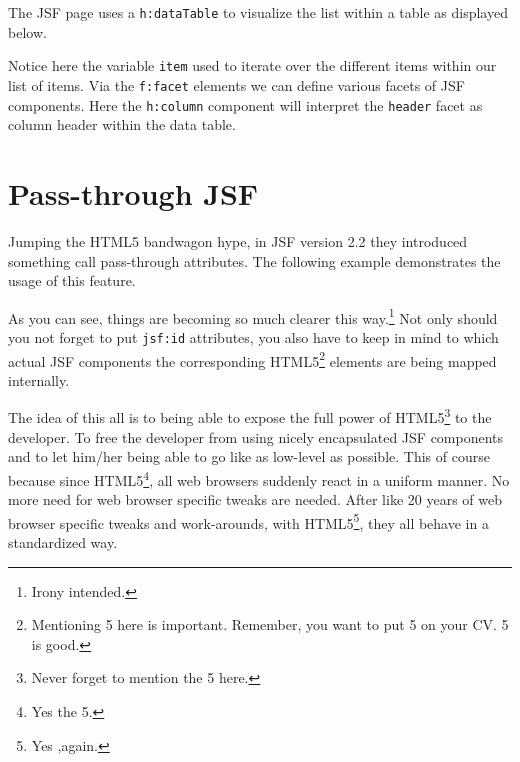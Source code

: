 The JSF page uses a \texttt{h:dataTable} to visualize the list within a table as displayed below.

Notice here the variable \texttt{item} used to iterate over the different items within our list of items.
Via the \texttt{f:facet} elements we can define various facets of JSF components.
Here the \texttt{h:column} component will interpret the \texttt{header} facet as column header within the data table.

\section{Pass-through JSF}
Jumping the HTML5 bandwagon hype, in JSF version 2.2 they introduced something call pass-through attributes.
The following example demonstrates the usage of this feature.

As you can see, things are becoming so much clearer this way.\footnote{Irony intended.}
Not only should you not forget to put \texttt{jsf:id} attributes,
you also have to keep in mind to which actual JSF components the corresponding HTML5\footnote{Mentioning 5 here is important. Remember, you want to put 5 on your CV. 5 is good.} elements are being mapped internally.

The idea of this all is to being able to expose the full power of HTML5\footnote{Never forget to mention the 5 here.} to the developer.
To free the developer from using nicely encapsulated JSF components and to let him/her being able to go like as low-level as possible.
This of course because since HTML5\footnote{Yes the 5.}, all web browsers suddenly react in a uniform manner.
No more need for web browser specific tweaks are needed.
After like 20 years of web browser specific tweaks and work-arounds, with HTML5\footnote{Yes ,again.}, they all behave in a standardized way.

